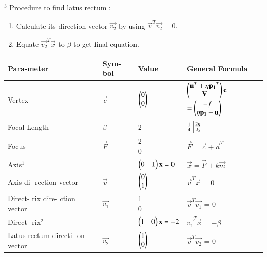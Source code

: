 \documentclass[journal,12pt,twocolumn]{IEEEtran}
\begin{document}
$^{3}$ Procedure to find latus rectum :
\begin{enumerate}
\item Calculate its direction vector $\vec{v_2}$ by using $\vec{v}^T\vec{v_2} =        0.$
    \item Equate $\vec{v_2}^T\vec{x}$ to $\beta$ to get final equation.
\end{enumerate}

\begin{table}[!ht]
\begin{center}
\begin{tabular}{ | m{1.4cm} | m{1.0cm}| m{2.4cm} | m{2.3cm} | } 
\hline
Para-\newline meter  & Sym-\newline bol  & Value  & General \newline Formula\\ 
\hline
Vertex & $\vec{c}$ & $\begin{pmatrix}0\\0\end{pmatrix}$ & $\begin{pmatrix}\mathbf{u}^T + \eta\mathbf{p_1}^T \\ \mathbf{V}\end{pmatrix}\mathbf{c}$ \newline $= \begin{pmatrix}-f \\ \eta\mathbf{p_1} - \mathbf{u}\end{pmatrix}$ \\ 
\hline
Focal \newline Length & $\beta$ & 2 & $\frac{1}{4}\left\vert\frac{2\eta}{\lambda_2}\right\vert$
\\ 
\hline
Focus & $\vec{F}$ & \myvec{2\\0} & $\vec{F}=\vec{c} + \vec{a}^T$ \\
\hline
Axis$^{1}$ &  & $\begin{pmatrix}0 & 1\end{pmatrix}\mathbf{x}=0$ & $\vec{x}=\vec{F}+k\vec{m}$ \\
\hline
Axis di- \newline rection \newline vector & $\vec{v}$ & $\begin{pmatrix}0 \\ 1\end{pmatrix}$ & $\vec{v}^T\vec{x}$ = 0 \\
\hline
Direct- \newline rix dire- \newline ction \newline vector & $\vec{v_1}$ & \myvec{1 \\ 0} & $\vec{v}^T\vec{v_1}$ = 0 \\
\hline
Direct- \newline rix$^{2}$ &  & $\begin{pmatrix}1 & 0\end{pmatrix}\mathbf{x} = -2$ & $\vec{v_1}^T\vec{x} = -\beta$ \\
\hline
Latus \newline rectum \newline directi- \newline on vector & $\vec{v_2}$ & $\begin{pmatrix}1 \\ 0\end{pmatrix}$ & $\vec{v}^T\vec{v_2}$ = 0 \\ 

\end{tabular}
\end{center}
\end{table}
\end{document}
